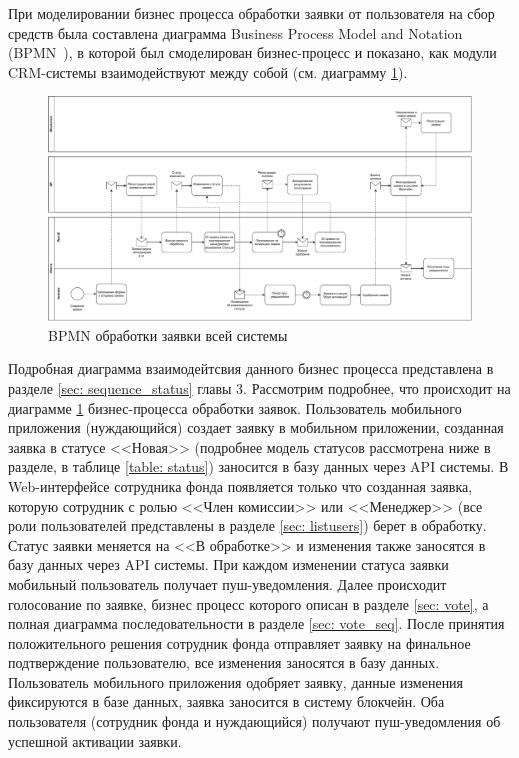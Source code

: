 \documentclass[a4paper,12pt,reqno]{article}
\begin{document}
При моделировании бизнес процесса обработки заявки от пользователя на сбор средств была составлена диаграмма Business Process Model and Notation (BPMN~\cite{bpmn}), в которой был смоделирован бизнес-процесс и показано, как модули CRM-системы взаимодействуют между собой (см. диаграмму \ref{pic: bpmn_1}).

\begin{figure}[H]
		\centering
		\includegraphics[width = \linewidth]{img/bpmn_status.pdf}
		\caption{BPMN обработки заявки всей системы}
		\label{pic: bpmn_1}
\end{figure}

Подробная диаграмма взаимодейтсвия данного бизнес процесса представлена в разделе \ref{sec: sequence_status} главы 3. Рассмотрим подробнее, что происходит на диаграмме \ref{pic: bpmn_1} бизнес-процесса обработки заявок. Пользователь мобильного приложения (нуждающийся) создает заявку в мобильном приложении, созданная заявка в статусе <<Новая>> (подробнее модель статусов рассмотрена ниже в разделе, в таблице \ref{table: status}) заносится в базу данных через API системы. В Web-интерфейсе сотрудника фонда появляется только что созданная заявка, которую сотрудник с ролью <<Член комиссии>> или <<Менеджер>> (все роли пользователей представлены в разделе \ref{sec: listusers}) берет в обработку. Статус заявки меняется на <<В обработке>> и изменения также заносятся в базу данных через API системы. При каждом изменении статуса заявки мобильный пользователь получает пуш-уведомления. Далее происходит голосование по заявке, бизнес процесс которого описан в разделе \ref{sec: vote}, а полная диаграмма последовательности в разделе \ref{sec: vote_seq}. После принятия положительного решения сотрудник фонда отправляет заявку на финальное подтверждение пользователю, все изменения заносятся в базу данных. Пользователь мобильного приложения одобряет заявку, данные изменения фиксируются в базе данных, заявка заносится в систему блокчейн. Оба пользователя (сотрудник фонда и нуждающийся) получают пуш-уведомления об успешной активации заявки.
\end{document}
